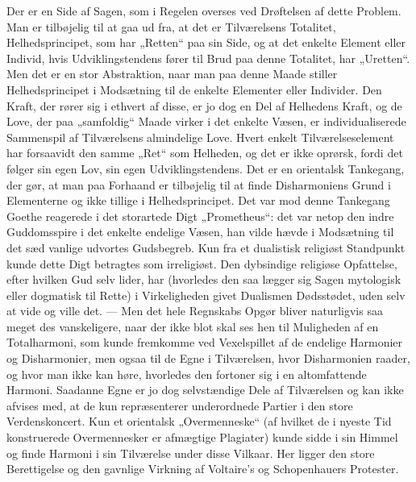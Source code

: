 \documentclass[12pt,a4paper,openany]{book}
\newcommand{\opage}[1]{\marginnote{\footnotesize\textit{[#1]}}}
\begin{document}
Der er en Side af Sagen, som i Regelen overses ved Drøftelsen af dette
Problem. Man er tilbøjelig til at gaa ud fra, at det er Tilværelsens
Totalitet, Helhedsprincipet, som har „Retten“ paa sin Side, og at det
enkelte Element eller Individ, hvis Udviklingstendens fører til Brud paa
denne Totalitet, har „Uretten“. Men det er en stor Abstraktion, naar man
paa denne Maade stiller Helhedsprincipet i Modsætning til de enkelte
Elementer eller Individer. Den Kraft, der rører sig i ethvert af disse,
er jo dog en Del af Helhedens Kraft, og de Love, der paa „samfoldig“
Maade virker i det enkelte Væsen, er individualiserede Sammenspil af
Tilværelsens almindelige Love. Hvert enkelt Tilværelseselement har
forsaavidt den samme „Ret“ som Helheden, og det er ikke oprørsk, fordi
det følger sin egen Lov, sin egen Udviklingstendens. Det er en
orientalsk Tankegang, der gør, at man paa Forhaand er tilbøjelig til at
finde Disharmoniens Grund i Elementerne og ikke tillige i
Helhedsprincipet. Det var mod denne Tankegang Goethe reagerede i det
storartede Digt „Prometheus“: det var netop den indre Guddomsspire i det
enkelte endelige Væsen, han vilde hævde i Modsætning til det sæd%
\opage{182}vanlige udvortes Gudsbegreb. Kun fra et dualistisk religiøst
Standpunkt kunde dette Digt betragtes som irreligiøst. Den dybsindige
religiøse Opfattelse, efter hvilken Gud selv lider, har (hvorledes den
saa lægger sig Sagen mytologisk eller dogmatisk til Rette) i
Virkeligheden givet Dualismen Dødsstødet, uden selv at vide og ville
det. --- Men det hele Regnskabs Opgør bliver naturligvis saa meget des
vanskeligere, naar der ikke blot skal ses hen til Muligheden af en
Totalharmoni, som kunde fremkomme ved Vexelspillet af de endelige
Harmonier og Disharmonier, men ogsaa til de Egne i Tilværelsen, hvor
Disharmonien raader, og hvor man ikke kan høre, hvorledes den fortoner
sig i en altomfattende Harmoni. Saadanne Egne er jo dog selvstændige
Dele af Tilværelsen og kan ikke afvises med, at de kun repræsenterer
underordnede Partier i den store Verdenskoncert. Kun et orientalsk
„Overmenneske“ (af hvilket de i nyeste Tid konstruerede Overmennesker er
afmægtige Plagiater) kunde sidde i sin Himmel og finde Harmoni i sin
Tilværelse under disse Vilkaar. Her ligger den store Berettigelse og den
gavnlige Virkning af Voltaire’s og Schopenhauers Protester.
\end{document}
